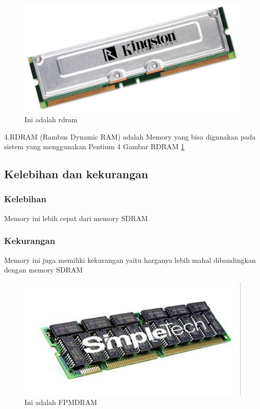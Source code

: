   \begin{figure}[ht]
  \centerline{\includegraphics[width=1\textwidth]{figures/rdram.jpg}}
  \caption{Ini adalah rdram}
  \label{rdram}
  \end{figure}

4.RDRAM (Rambus Dynamic RAM) adalah Memory yang bisa digunakan pada sistem yang menggunakan Pentium 4
Gambar RDRAM \ref{rdram}
  \subsection{Kelebihan dan kekurangan}
    \subsubsection{Kelebihan}
    \-Memory ini lebih cepat dari memory SDRAM
    \subsubsection{Kekurangan}
    \-Memory ini juga memiliki kekurangan yaitu harganya lebih mahal dibandingkan dengan memory SDRAM

  \begin{figure}[ht]
  \centerline{\includegraphics[width=1\textwidth]{figures/FPMDRAM.jpg}}
  \caption{Ini adalah FPMDRAM}
  \label{FPMDRAM}
  \end{figure}

